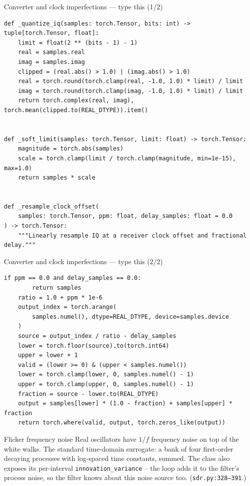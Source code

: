 \documentclass[10pt]{beamer}
\begin{document}
\begin{frame}[fragile]{Converter and clock imperfections --- type this (1/2)}
\begin{lstlisting}[basicstyle=\ttfamily\tiny]
def _quantize_iq(samples: torch.Tensor, bits: int) -> tuple[torch.Tensor, float]:
    limit = float(2 ** (bits - 1) - 1)
    real = samples.real
    imag = samples.imag
    clipped = (real.abs() > 1.0) | (imag.abs() > 1.0)
    real = torch.round(torch.clamp(real, -1.0, 1.0) * limit) / limit
    imag = torch.round(torch.clamp(imag, -1.0, 1.0) * limit) / limit
    return torch.complex(real, imag), torch.mean(clipped.to(REAL_DTYPE)).item()


def _soft_limit(samples: torch.Tensor, limit: float) -> torch.Tensor:
    magnitude = torch.abs(samples)
    scale = torch.clamp(limit / torch.clamp(magnitude, min=1e-15), max=1.0)
    return samples * scale


def _resample_clock_offset(
    samples: torch.Tensor, ppm: float, delay_samples: float = 0.0
) -> torch.Tensor:
    """Linearly resample IQ at a receiver clock offset and fractional delay."""
\end{lstlisting}
\end{frame}

\begin{frame}[fragile]{Converter and clock imperfections --- type this (2/2)}
\begin{lstlisting}[basicstyle=\ttfamily\tiny]
    if ppm == 0.0 and delay_samples == 0.0:
        return samples
    ratio = 1.0 + ppm * 1e-6
    output_index = torch.arange(
        samples.numel(), dtype=REAL_DTYPE, device=samples.device
    )
    source = output_index / ratio - delay_samples
    lower = torch.floor(source).to(torch.int64)
    upper = lower + 1
    valid = (lower >= 0) & (upper < samples.numel())
    lower = torch.clamp(lower, 0, samples.numel() - 1)
    upper = torch.clamp(upper, 0, samples.numel() - 1)
    fraction = source - lower.to(REAL_DTYPE)
    output = samples[lower] * (1.0 - fraction) + samples[upper] * fraction
    return torch.where(valid, output, torch.zeros_like(output))
\end{lstlisting}
\end{frame}

\begin{frame}{Flicker frequency noise}
  Real oscillators have $1/f$ frequency noise on top of the
  white walks. The standard time-domain surrogate: a bank of
  four first-order decaying processes with log-spaced time
  constants, summed. The class also exposes its per-interval
  \texttt{innovation\_variance} -- the loop adds it to the
  filter's process noise, so the filter knows about this noise
  source too. (\texttt{sdr.py:328--391}.)
\end{frame}
\end{document}
